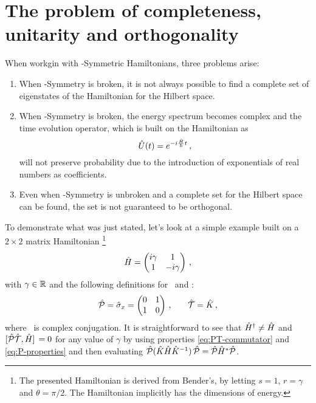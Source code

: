 
    \section{The problem of completeness, unitarity and orthogonality}
        When workgin with \PT-Symmetric Hamiltonians, three problems arise:
        \begin{enumerate}[label = \mybullet]
            \item When \PT-Symmetry is broken, it is not always possible to find a complete set of eigenstates of the Hamiltonian for the Hilbert space.
            \item When \PT-Symmetry is broken, the energy spectrum becomes complex and the time evolution operator, which is built on the Hamiltonian as 
            \begin{equation}
                \label{eq:time-evolution}
                \hU\pqty{t} = \myexp{-i\frac{\hH}{\hbar}t}
                \mycomma
            \end{equation}
            will not preserve probability due to the introduction of exponentials of real numbers as coefficients.
            \item Even when \PT-Symmetry is unbroken and a complete set for the Hilbert space can be found, the set is not guaranteed to be orthogonal.
        \end{enumerate}
        To demonstrate what was just stated, let's look at a simple example built on a $2\times2$ matrix Hamiltonian \cite{Bender2005,Bender2007}\footnote{The presented Hamiltonian is derived from Bender's, by letting $s = 1$, $r = \gamma$ and $\theta = \pi/2$. The Hamiltonian implicitly has the dimensions of energy.}
        \begin{equation}
            \label{eq:ex:reduced-2x2-hamiltonian}
            \hH = \pmqty{\dmat[1]{i\gamma, -i\gamma}}
            \mycomma
        \end{equation}
        with $\gamma\in\mathbb{R}$ and the following definitions for \hP\ and \hT :
        \begin{equation}
            \label{eq:ex:reduced-2x2-P-T}
            \hP = \hat{\sigma}_x = \pmqty{\admat[0]{1,1}}
            \mycomma\qquad
            \hT = \hK
            \mycomma
        \end{equation}
        where \hK\ is complex conjugation. It is straightforward to see that $\hat{H}^\dag \neq \hat{H}$ and $\comm*{\hPT}{\hH} = 0$ for any value of $\gamma$ by using properties \eqref{eq:PT-commutator} and \eqref{eq:P-properties} and then evaluating $\hP\pqty*{\hK\hH\hK^{-1}}\hP = \hP\hH^*\hP$.
        
